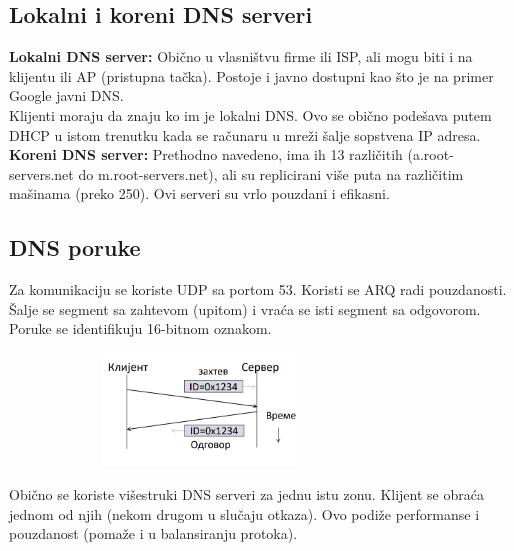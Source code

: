 \documentclass[a4paper]{article}
\begin{document}
    \subsection{Lokalni i koreni DNS serveri}
        \textbf{Lokalni DNS server:} Obično u vlasništvu firme ili ISP, ali mogu biti
        i na klijentu ili AP (pristupna tačka). Postoje i javno dostupni kao što je
        na primer Google javni DNS. \\
        \indent Klijenti moraju da znaju ko im je lokalni DNS. Ovo se obično podešava
        putem DHCP u istom trenutku kada se računaru u mreži šalje sopstvena IP adresa.\\
        \indent \textbf{Koreni DNS server:} Prethodno navedeno, ima ih 13 različitih 
        (a.root-servers.net do m.root-servers.net), ali su replicirani više puta na
        različitim mašinama (preko 250). Ovi serveri su vrlo pouzdani i efikasni.

    \subsection{DNS poruke}
        Za komunikaciju se koriste UDP sa portom 53. Koristi se ARQ radi pouzdanosti. Šalje se
        segment sa zahtevom (upitom) i vraća se isti segment sa odgovorom. Poruke se identifikuju
        16-bitnom oznakom. 
        \begin{figure}[H]
            \begin{center}
                \includegraphics[width=80mm,height=30mm]{Slike/dns6.png}
            \end{center}
        \end{figure}
        Obično se koriste višestruki DNS serveri za jednu istu zonu. Klijent se obraća jednom od
        njih (nekom drugom u slučaju otkaza). Ovo podiže performanse i pouzdanost (pomaže i u
        balansiranju protoka).
\end{document}
